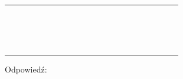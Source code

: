 \documentclass[10pt]{article}
\begin{document}
\begin{center}
\begin{tabular}{|c|c|c|c|c|c|c|c|c|c|c|c|c|c|c|c|c|c|c|c|c|}
 &  &  &  &  &  &  &  &  &  &  &  &  &  &  &  &  &  &  &  &  \\
\hline
 &  &  &  &  &  &  &  &  &  &  &  &  &  &  &  &  &  &  &  &  \\
\hline
 &  &  &  &  &  &  &  &  &  &  &  &  &  &  &  &  &  &  &  &  \\
\hline
 &  &  &  &  &  &  &  &  &  &  &  &  &  &  &  &  &  &  &  &  \\
\hline
 &  &  &  &  &  &  &  &  &  &  &  &  &  &  &  &  &  &  &  &  \\
\hline
 &  &  &  &  &  &  &  &  &  &  &  &  &  &  &  &  &  &  &  &  \\
\hline
 &  &  &  &  &  &  &  &  &  &  &  &  &  &  &  &  &  &  &  &  \\
\hline
 &  &  &  &  &  &  &  &  &  &  &  &  &  &  &  &  &  &  &  &  \\
\hline
 &  &  &  &  &  &  &  &  &  &  &  &  &  &  &  &  &  &  &  &  \\
\hline
 &  &  &  &  &  &  &  &  &  &  &  &  &  &  &  &  &  &  &  &  \\
\hline
 &  &  &  &  &  &  &  &  &  &  &  &  &  &  &  &  &  &  &  &  \\
\hline
 &  &  &  &  &  &  &  &  &  &  &  &  &  &  &  &  &  &  &  &  \\
\hline
 &  &  &  &  &  &  &  &  &  &  &  &  &  &  &  &  &  &  &  &  \\
\hline
 &  &  &  &  &  &  &  &  &  &  &  &  &  &  &  &  &  &  &  &  \\
\hline
 &  &  &  &  &  &  &  &  &  &  &  &  &  &  &  &  &  &  &  &  \\
\hline
 &  &  &  &  &  &  &  &  &  &  &  &  &  &  &  &  &  &  &  &  \\
\hline
 &  &  &  &  &  &  &  &  &  &  &  &  &  &  &  &  &  &  &  &  \\
\hline
\end{tabular}
\end{center}

Odpowiedź:
\end{document}
